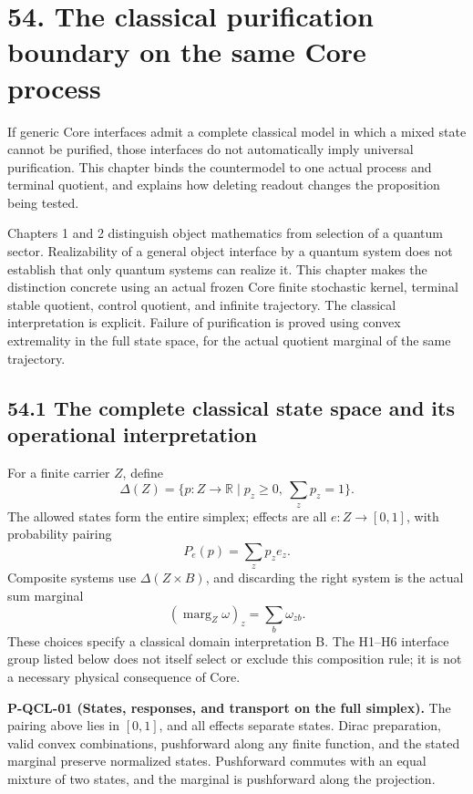 \documentclass[
  11pt,
  oneside]{book}
\begin{document}
\chapter{54. The classical purification boundary on the same Core
process}\label{ch-54}

If generic Core interfaces admit a complete classical model in which a
mixed state cannot be purified, those interfaces do not automatically
imply universal purification. This chapter binds the countermodel to one
actual process and terminal quotient, and explains how deleting readout
changes the proposition being tested.

Chapters 1 and 2 distinguish object mathematics from selection of a
quantum sector. Realizability of a general object interface by a quantum
system does not establish that only quantum systems can realize it. This
chapter makes the distinction concrete using an actual frozen Core
finite stochastic kernel, terminal stable quotient, control quotient,
and infinite trajectory. The classical interpretation is explicit.
Failure of purification is proved using convex extremality in the full
state space, for the actual quotient marginal of the same trajectory.

\section{54.1 The complete classical state space and its operational
interpretation}

For a finite carrier \(Z\), define \[
\Delta(Z)=\{p:Z\to\mathbb R\mid p_z\ge0,\ \sum_zp_z=1\}.
\] The allowed states form the entire simplex; effects are all
\(e:Z\to[0,1]\), with probability pairing \[
P_e(p)=\sum_zp_ze_z.
\] Composite systems use \(\Delta(Z\times B)\), and discarding the right
system is the actual sum marginal \[
(\operatorname{marg}_Z\omega)_z=\sum_b\omega_{zb}.
\] These choices specify a classical domain interpretation B. The H1--H6
interface group listed below does not itself select or exclude this
composition rule; it is not a necessary physical consequence of Core.

\label{p-qcl-01}{}

\textbf{P-QCL-01 (States, responses, and transport on the full
simplex).} The pairing above lies in \([0,1]\), and all effects separate
states. Dirac preparation, valid convex combinations, pushforward along
any finite function, and the stated marginal preserve normalized states.
Pushforward commutes with an equal mixture of two states, and the
marginal is pushforward along the projection.
\end{document}
